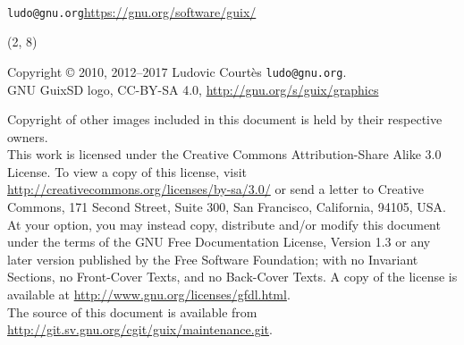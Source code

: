 \documentclass{beamer}
\begin{document}
\begin{frame}[plain]

\vfill{
  \vspace{2.5cm}
  \\[1.0cm]
  \texttt{ludo@gnu.org}\hfill{\alert{\url{https://gnu.org/software/guix/}}}
  \\
}
\end{frame}

\begin{frame}{}

  \begin{textblock}{12}(2, 8)
    \tiny{
      Copyright \copyright{} 2010, 2012--2017 Ludovic Courtès \texttt{ludo@gnu.org}.\\[3.0mm]
      GNU GuixSD logo, CC-BY-SA 4.0, \url{http://gnu.org/s/guix/graphics}

      Copyright of other images included in this document is held by
      their respective owners.
      \\[3.0mm]
      This work is licensed under the \alert{Creative Commons
        Attribution-Share Alike 3.0} License.  To view a copy of this
      license, visit
      \url{http://creativecommons.org/licenses/by-sa/3.0/} or send a
      letter to Creative Commons, 171 Second Street, Suite 300, San
      Francisco, California, 94105, USA.
      \\[2.0mm]
      At your option, you may instead copy, distribute and/or modify
      this document under the terms of the \alert{GNU Free Documentation
        License, Version 1.3 or any later version} published by the Free
      Software Foundation; with no Invariant Sections, no Front-Cover
      Texts, and no Back-Cover Texts.  A copy of the license is
      available at \url{http://www.gnu.org/licenses/gfdl.html}.
      \\[2.0mm]
      The source of this document is available from
      \url{http://git.sv.gnu.org/cgit/guix/maintenance.git}.
    }
  \end{textblock}
\end{frame}
\end{document}
